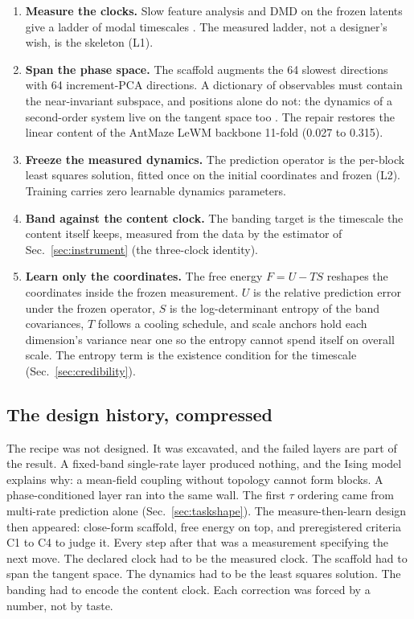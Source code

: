 \documentclass[11pt]{article}
\newcommand{\tauc}{\tau}
\newcommand{\term}[1]{\textbf{#1}}
\begin{document}
\begin{enumerate}
\item \term{Measure the clocks.} Slow feature analysis and DMD on the frozen latents give a ladder of modal timescales \citep{sfa,dmd}. The measured ladder, not a designer's wish, is the skeleton (L1).
\item \term{Span the phase space.} The scaffold augments the 64 slowest directions with 64 increment-PCA directions. A dictionary of observables must contain the near-invariant subspace, and positions alone do not: the dynamics of a second-order system live on the tangent space too \citep{koopman_edmd}. The repair restores the linear content of the AntMaze LeWM backbone 11-fold (0.027 to 0.315).
\item \term{Freeze the measured dynamics.} The prediction operator is the per-block least squares solution, fitted once on the initial coordinates and frozen (L2). Training carries zero learnable dynamics parameters.
\item \term{Band against the content clock.} The banding target is the timescale the content itself keeps, measured from the data by the estimator of Sec.~\ref{sec:instrument} (the three-clock identity).
\item \term{Learn only the coordinates.} The free energy $F = U - T S$ reshapes the coordinates inside the frozen measurement. $U$ is the relative prediction error under the frozen operator, $S$ is the log-determinant entropy of the band covariances, $T$ follows a cooling schedule, and scale anchors hold each dimension's variance near one so the entropy cannot spend itself on overall scale. The entropy term is the existence condition for the timescale (Sec.~\ref{sec:credibility}).
\end{enumerate}

\subsection{The design history, compressed}
\label{sec:history}

The recipe was not designed.
It was excavated, and the failed layers are part of the result.
A fixed-band single-rate layer produced nothing, and the Ising model explains why: a mean-field coupling without topology cannot form blocks.
A phase-conditioned layer ran into the same wall.
The first $\tauc$ ordering came from multi-rate prediction alone (Sec.~\ref{sec:taskshape}).
The measure-then-learn design then appeared: close-form scaffold, free energy on top, and preregistered criteria C1 to C4 to judge it.
Every step after that was a measurement specifying the next move.
The declared clock had to be the measured clock.
The scaffold had to span the tangent space.
The dynamics had to be the least squares solution.
The banding had to encode the content clock.
Each correction was forced by a number, not by taste.
\end{document}
